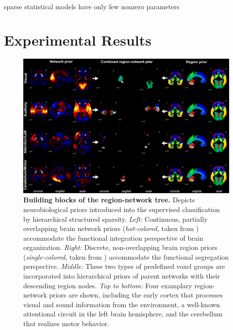 \documentclass{article} %
\begin{document}
sparse statistical models have only few nonzero parameters








\section{Experimental Results}


\begin{figure}
\begin{centering}
\includegraphics[width=1.00\textwidth]{figures/reg_net_prior.pdf}
\end{centering}
\vspace{-0.6cm}
\caption{\textbf{Building blocks of the region-network tree.}
Depicts neurobiological priors introduced into the supervised classification
by hierarchical structured sparsity.
\textit{Left:} Continuous, partially overlapping brain network priors
(\textit{hot-colored}, taken from \cite{smith2009})
accommodate the functional integration
perspective of brain organization.
\textit{Right:} Discrete, non-overlapping brain region priors
(\textit{single-colored}, taken from \cite{crad12})
accommodate the functional segregation perspective.
\textit{Middle:} These two types of predefined voxel groups are incorporated
into hierarchical priors of parent networks with their
descending region nodes.
\textit{Top to bottom:} Four examplary region-network priors
are shown, including
the early cortex that processes
visual and sound information from the environment,
a well-known attentional circuit in the left brain hemisphere,
and
the cerebellum that realizes motor behavior.
}
\label{fig_priors}
\end{figure}
\end{document}
